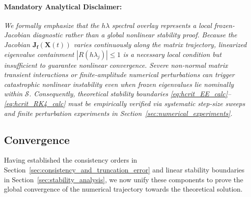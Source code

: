 \documentclass[11pt,a4paper]{article}
\theoremstyle{definition}
\theoremstyle{remark}
\begin{document}
\paragraph{Mandatory Analytical Disclaimer:}
\emph{We formally emphasize that the $h\lambda$ spectral overlay represents a local frozen-Jacobian diagnostic rather than a global nonlinear stability proof. Because the Jacobian $\mathbf{J}_{\mathbf{f}}(\mathbf{X}(t))$ varies continuously along the matrix trajectory, linearized eigenvalue containment $|R(h\lambda_j)| \le 1$ is a necessary local condition but insufficient to guarantee nonlinear convergence. Severe non-normal matrix transient interactions or finite-amplitude numerical perturbations can trigger catastrophic nonlinear instability even when frozen eigenvalues lie nominally within $\mathcal{S}$. Consequently, theoretical stability boundaries \eqref{eq:hcrit_EE_calc}--\eqref{eq:hcrit_RK4_calc} must be empirically verified via systematic step-size sweeps and finite perturbation experiments in Section~\ref{sec:numerical_experiments}.}

\subsection{Convergence}

\label{sec:convergence}

Having established the consistency orders in Section~\ref{sec:consistency_and_truncation_error} and linear stability boundaries in Section~\ref{sec:stability_analysis}, we now unify these components to prove the global convergence of the numerical trajectory towards the theoretical solution.
\end{document}
